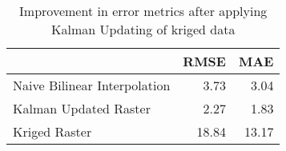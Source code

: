 \begin{table}
\centering
\caption{Improvement in error metrics after applying Kalman Updating of kriged data}
\label{tab:oahu1_gebco_raster_error}
\begin{tabular}{lrr}
\toprule
 & RMSE & MAE \\
\midrule
Naive Bilinear Interpolation & 3.73 & 3.04 \\
Kalman Updated Raster & 2.27 & 1.83 \\
Kriged Raster & 18.84 & 13.17 \\
\bottomrule
\end{tabular}
\end{table}
